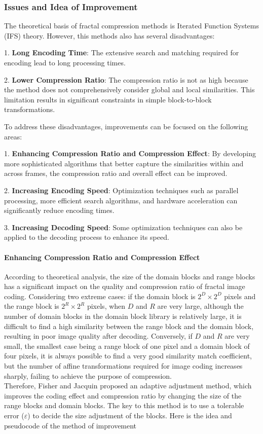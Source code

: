 \documentclass[a4paper,11pt, titlepage]{article}
\theoremstyle{definition}
\theoremstyle{plain}
\theoremstyle{remark}
\theoremstyle{definition}
\begin{document}
\subsubsection{Issues and Idea of Improvement}

The theoretical basis of fractal compression methods is Iterated Function Systems (IFS) theory. However, this methods also has several disadvantages:

1. \textbf{Long Encoding Time}: The extensive search and matching required for encoding lead to long processing times.

2. \textbf{Lower Compression Ratio}: The compression ratio is not as high because the method does not comprehensively consider global and local similarities. This limitation results in significant constraints in simple block-to-block transformations.

To address these disadvantages, improvements can be focused on the following areas:

1. \textbf{Enhancing Compression Ratio and Compression Effect}: By developing more sophisticated algorithms that better capture the similarities within and across frames, the compression ratio and overall effect can be improved.

2. \textbf{Increasing Encoding Speed}: Optimization techniques such as parallel processing, more efficient search algorithms, and hardware acceleration can significantly reduce encoding times.

3. \textbf{Increasing Decoding Speed}: Some optimization techniques can also be applied to the decoding process to enhance its speed.

\paragraph{Enhancing Compression Ratio and Compression Effect}

According to theoretical analysis, the size of the domain blocks and range blocks has a significant impact on the quality and compression ratio of fractal image coding. Considering two extreme cases: if the domain block is \(2^D \times 2^D\) pixels and the range block is \(2^R \times 2^R\) pixels, when \(D\) and \(R\) are very large, although the number of domain blocks in the domain block library is relatively large, it is difficult to find a high similarity between the range block and the domain block, resulting in poor image quality after decoding. Conversely, if \(D\) and \(R\) are very small, the smallest case being a range block of one pixel and a domain block of four pixels, it is always possible to find a very good similarity match coefficient, but the number of affine transformations required for image coding increases sharply, failing to achieve the purpose of compression.\\
Therefore, Fisher and Jacquin proposed an adaptive adjustment method, which improves the coding effect and compression ratio by changing the size of the range blocks and domain blocks. The key to this method is to use a tolerable error (\( \varepsilon \)) to decide the size adjustment of the blocks.
Here is the idea and pseudocode of the method of improvement
\end{document}
